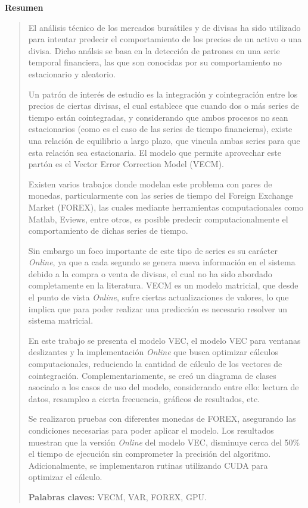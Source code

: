 \newpage

\vspace*{2cm}
\thispagestyle{empty}
{\bfseries \Huge Resumen }
\vspace{1.5cm}

\begin{quotation}
El análisis técnico de los mercados bursátiles y de divisas ha sido utilizado
para intentar predecir el comportamiento de los precios de un activo o una
divisa. Dicho análsis se basa en la detección de patrones en una serie temporal
financiera, las que son conocidas por su comportamiento no estacionario y
aleatorio. 


Un patrón de interés de estudio es la integración y cointegración entre los
precios de ciertas divisas, el cual establece que cuando dos o más series de
tiempo están cointegradas, y considerando que ambos procesos no sean
estacionarios (como es el caso de las series de tiempo financieras), existe una
relación de equilibrio a largo plazo, que vincula ambas series para que esta
relación sea estacionaria. El modelo que permite aprovechar este partón es el
Vector Error Correction Model (VECM).

Existen varios trabajos donde modelan este problema con pares de monedas,
particularmente con las series de tiempo del Foreign Exchange Market (FOREX),
las cuales mediante herramientas computacionales como Matlab, Eviews, entre
otros, es posible predecir computacionalmente el comportamiento de dichas
series de tiempo.

Sin embargo un foco importante de este tipo de series es su carácter
\emph{Online}, ya que a cada segundo se genera nueva información en el sistema
debido a la compra o venta de divisas, el cual no ha sido abordado
completamente en la literatura.  VECM es un modelo matricial, que desde el
punto de vista \emph{Online}, sufre ciertas actualizaciones de valores, lo que
implica que para poder realizar una predicción es necesario resolver un sistema
matricial.

En este trabajo se presenta el modelo VEC, el modelo VEC para ventanas
deslizantes y la implementación \emph{Online} que busca optimizar cálculos
computacionales, reduciendo la cantidad de cálculo de los vectores de
cointegración.  Complementariamente, se creó un diagrama de clases asociado a
los casos de uso del modelo, considerando entre ello: lectura de datos,
resampleo a cierta frecuencia, gráficos de resultados, etc.

Se realizaron pruebas con diferentes monedas de FOREX, asegurando las
condiciones necesarias para poder aplicar el modelo. Los resultados muestran
que la versión \emph{Online} del modelo VEC, disminuye cerca del 50\% el tiempo
de ejecución sin comprometer la precisión del algoritmo. Adicionalmente, se
implementaron rutinas utilizando CUDA para optimizar el cálculo.

{\bf Palabras claves:} VECM, VAR, FOREX, GPU.

\end{quotation}
